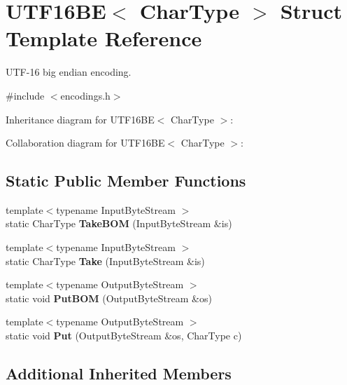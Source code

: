 \hypertarget{struct_u_t_f16_b_e}{}\section{U\+T\+F16\+BE$<$ Char\+Type $>$ Struct Template Reference}
\label{struct_u_t_f16_b_e}


U\+T\+F-\/16 big endian encoding.  




{\ttfamily \#include $<$encodings.\+h$>$}



Inheritance diagram for U\+T\+F16\+BE$<$ Char\+Type $>$\+:


Collaboration diagram for U\+T\+F16\+BE$<$ Char\+Type $>$\+:
\subsection*{Static Public Member Functions}
\begin{DoxyCompactItemize}
\item 
\mbox{\label{struct_u_t_f16_b_e_a5d5184a373149c69b4b8baf8507f9591}} 
{\footnotesize template$<$typename Input\+Byte\+Stream $>$ }\\static Char\+Type {\bfseries Take\+B\+OM} (Input\+Byte\+Stream \&is)
\item 
\mbox{\label{struct_u_t_f16_b_e_a671ca76d54f45aa5f62eb86c4e69738a}} 
{\footnotesize template$<$typename Input\+Byte\+Stream $>$ }\\static Char\+Type {\bfseries Take} (Input\+Byte\+Stream \&is)
\item 
\mbox{\label{struct_u_t_f16_b_e_ae109dda1ad7955049589885ea5a13652}} 
{\footnotesize template$<$typename Output\+Byte\+Stream $>$ }\\static void {\bfseries Put\+B\+OM} (Output\+Byte\+Stream \&os)
\item 
\mbox{\label{struct_u_t_f16_b_e_ab0f964c3ec9ac6cc47f2875ae112dbfe}} 
{\footnotesize template$<$typename Output\+Byte\+Stream $>$ }\\static void {\bfseries Put} (Output\+Byte\+Stream \&os, Char\+Type c)
\end{DoxyCompactItemize}
\subsection*{Additional Inherited Members}



